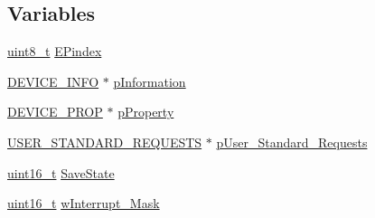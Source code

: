 \subsection*{Variables}
\begin{DoxyCompactItemize}
\item 
\hyperlink{stdint_8h_aba7bc1797add20fe3efdf37ced1182c5}{uint8\-\_\-t} \hyperlink{_s_t_m32_f10x_2_libraries_2_s_t_m32___u_s_b-_f_s-_device___driver_2inc_2usb__init_8h_a227b4da72d62002d4c00ea5e82ba83c9}{E\-Pindex}
\item 
\hyperlink{_s_t_m32_f10x_2_libraries_2_s_t_m32___u_s_b-_f_s-_device___driver_2inc_2usb__core_8h_a6c959d0e0181f5f4b6a8b6b3f8e16760}{D\-E\-V\-I\-C\-E\-\_\-\-I\-N\-F\-O} $\ast$ \hyperlink{_s_t_m32_f10x_2_libraries_2_s_t_m32___u_s_b-_f_s-_device___driver_2inc_2usb__init_8h_aee2c852e2abf0858434a286864925289}{p\-Information}
\item 
\hyperlink{_s_t_m32_f10x_2_libraries_2_s_t_m32___u_s_b-_f_s-_device___driver_2inc_2usb__core_8h_a90353becd4185446508b796a7f39fbce}{D\-E\-V\-I\-C\-E\-\_\-\-P\-R\-O\-P} $\ast$ \hyperlink{_s_t_m32_f10x_2_libraries_2_s_t_m32___u_s_b-_f_s-_device___driver_2inc_2usb__init_8h_a097ddc79931f5731f55b4c7d4874ea7e}{p\-Property}
\item 
\hyperlink{_s_t_m32_f10x_2_libraries_2_s_t_m32___u_s_b-_f_s-_device___driver_2inc_2usb__core_8h_abf9887b82ae511cfb155d0d97c9a7c1a}{U\-S\-E\-R\-\_\-\-S\-T\-A\-N\-D\-A\-R\-D\-\_\-\-R\-E\-Q\-U\-E\-S\-T\-S} $\ast$ \hyperlink{_s_t_m32_f10x_2_libraries_2_s_t_m32___u_s_b-_f_s-_device___driver_2inc_2usb__init_8h_a54cd36264ecd2640f1812a61a6d66bfb}{p\-User\-\_\-\-Standard\-\_\-\-Requests}
\item 
\hyperlink{stdint_8h_a273cf69d639a59973b6019625df33e30}{uint16\-\_\-t} \hyperlink{_s_t_m32_f10x_2_libraries_2_s_t_m32___u_s_b-_f_s-_device___driver_2inc_2usb__init_8h_af8f4742d656fff9ee1db1ef79a53150a}{Save\-State}
\item 
\hyperlink{stdint_8h_a273cf69d639a59973b6019625df33e30}{uint16\-\_\-t} \hyperlink{_s_t_m32_f10x_2_libraries_2_s_t_m32___u_s_b-_f_s-_device___driver_2inc_2usb__init_8h_a6304592c11373c53999f23226cb5e5d7}{w\-Interrupt\-\_\-\-Mask}
\end{DoxyCompactItemize}


